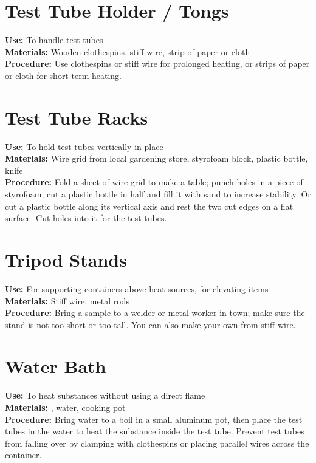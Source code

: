 \section{Test Tube Holder / Tongs}
\vspace{-10pt}
\textbf{Use:} To handle test tubes\\
\textbf{Materials:} Wooden clothespins, stiff wire, strip of paper or cloth\\
\textbf{Procedure:} Use clothespins or stiff wire for prolonged heating, or strips of paper or cloth for short-term heating.

\section{Test Tube Racks}
\vspace{-10pt}
\textbf{Use:} To hold test tubes vertically in place\\
\textbf{Materials:} Wire grid from local gardening store, styrofoam block, plastic bottle, knife\\
\textbf{Procedure:} Fold a sheet of wire grid to make a table; punch holes in a piece of styrofoam; cut a plastic bottle in half and fill it with sand to increase stability. Or cut a plastic bottle along its vertical axis and rest the two cut edges on a flat surface. Cut holes into it for the test tubes.

\section{Tripod Stands}
\vspace{-10pt}
\textbf{Use:} For supporting containers above heat sources, for elevating items\\
\textbf{Materials:} Stiff wire, metal rods\\
\textbf{Procedure:} Bring a sample to a welder or metal worker in town; make sure the stand is not too short or too tall. You can also make your own from stiff wire.

\section{Water Bath}
\label{sec:hotwaterbathes}
\vspace{-10pt}
\textbf{Use:} To heat substances without using a direct flame\\
\textbf{Materials:} , water, cooking pot\\
\textbf{Procedure:} Bring water to a boil in a small aluminum pot, then place the test tubes in the water to heat the substance inside the test tube. Prevent test tubes from falling over by clamping with clothespins or placing parallel wires across the container.

